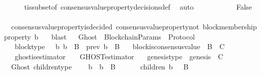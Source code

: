 \begin{isabellebody}
\ \ \ \ \isamarkupfalse%
\ {\isasymSigma}t{\isacharunderscore}is{\isacharunderscore}subset{\isacharunderscore}of{\isacharunderscore}{\isasymSigma}\ consensus{\isacharunderscore}value{\isacharunderscore}property{\isacharunderscore}decisions{\isacharunderscore}def\ \isamarkupfalse%
\ auto\ \ \ \ \ \ \isanewline
\ \ \isamarkupfalse%
\ \isamarkupfalse%
\ False\isanewline
\ \ \ \ \ \isamarkupfalse%
\ {\isacartoucheopen}{\isasymnot}\ consensus{\isacharunderscore}value{\isacharunderscore}property{\isacharunderscore}is{\isacharunderscore}decided\ {\isacharparenleft}consensus{\isacharunderscore}value{\isacharunderscore}property{\isacharunderscore}not\ {\isacharparenleft}block{\isacharunderscore}membership{\isacharunderscore}property\ b{}{\isacharparenright}{\isacharcomma}\ {\isasymsigma}{}{\isacharparenright}{\isacartoucheclose}\ \isamarkupfalse%
\ blast\isanewline
\ \isamarkupfalse%
%
\endisatagproof
{\isafoldproof}%
%
\isadelimproof
\isanewline
%
\endisadelimproof
\isanewline
\isanewline
\isanewline
{}\isamarkupfalse%
\ Ghost\ {\isacharequal}\ BlockchainParams\ {\isacharplus}\ Protocol\ {\isacharplus}\isanewline
\ \ \ block{\isacharunderscore}type\ {\isacharcolon}\ {\isachardoublequoteopen}{\isasymforall}\ b{\isachardot}\ b\ {\isasymin}\ B\ {\isasymlongleftrightarrow}\ prev\ b\ {\isasymin}\ B{\isachardoublequoteclose}\isanewline
\ \ \ block{\isacharunderscore}is{\isacharunderscore}consensus{\isacharunderscore}value\ {\isacharcolon}\ {\isachardoublequoteopen}B\ {\isacharequal}\ C{\isachardoublequoteclose}\isanewline
\ \ \ ghost{\isacharunderscore}is{\isacharunderscore}estimator\ {\isacharcolon}\ {\isachardoublequoteopen}{\isasymepsilon}\ {\isacharequal}\ GHOST{\isacharunderscore}estimator{\isachardoublequoteclose}\isanewline
\ \ \ genesis{\isacharunderscore}type\ {\isacharcolon}\ {\isachardoublequoteopen}genesis\ {\isasymin}\ C{\isachardoublequoteclose}\isanewline
\isanewline
{}\isamarkupfalse%
\ {\isacharparenleft}\ Ghost{\isacharparenright}\ children{\isacharunderscore}type\ {\isacharcolon}\isanewline
\ \ {\isachardoublequoteopen}{\isasymforall}\ b\ {\isasymsigma}{\isachardot}\ b\ {\isasymin}\ B\ {\isasymand}\ {\isasymsigma}\ {\isasymin}\ {\isasymSigma}\ {\isasymlongrightarrow}\ \ children\ {\isacharparenleft}b{\isacharcomma}\ {\isasymsigma}{\isacharparenright}\ {\isasymsubseteq}\ B{\isachardoublequoteclose}\isanewline

\end{isabellebody}
